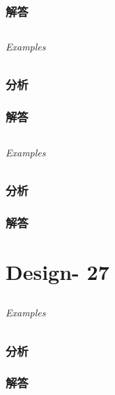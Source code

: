 \documentclass[UTF8,a4paper,12pt]{ctexbook}
\begin{document}
	\subsection{解答}
	
\section{}
	
	\subparagraph{Examples}
	
	\subsection{分析}
	
	\subsection{解答}
	
\section{}
	
	\subparagraph{Examples}
	
	\subsection{分析}
	
	\subsection{解答}
\chapter{Design- 27}
\section{}
	
	\subparagraph{Examples}
	
	\subsection{分析}
	
	\subsection{解答}
	
\section{}
	
\end{document}
